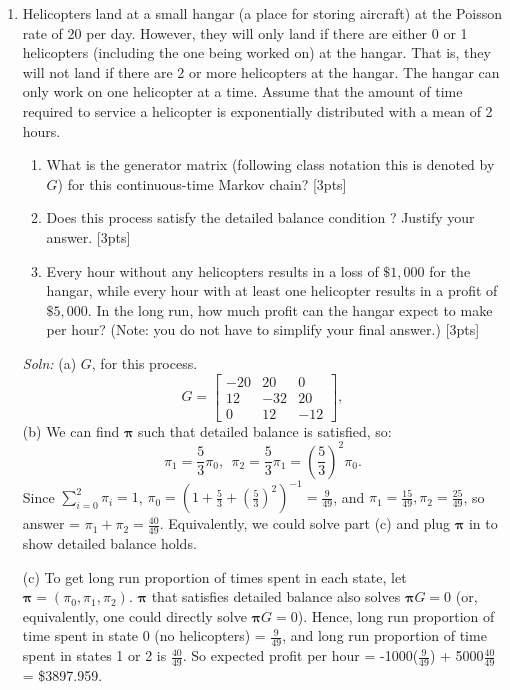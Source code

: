 \documentclass[12pt]{article}
\newcommand{\bpi}{{\mathbf \pi}}
\begin{document}
\begin{enumerate}
\newpage

\item Helicopters land at a small hangar (a place for storing
  aircraft) at the Poisson rate of 20 per day.  However, they will
  only land if there are either 0 or 1 helicopters (including the one
  being worked on) at the hangar. That is, they will not land if there
  are 2 or more helicopters at the hangar. The hangar can only work on
  one helicopter at a time. Assume that the amount of time required to
  service a helicopter is exponentially distributed with a mean of 2
  hours.
\begin{enumerate}
\item What is the generator matrix (following class notation this is denoted by $G$) for this continuous-time Markov chain? [3pts]
\item Does this process satisfy the detailed balance condition ? Justify your answer. [3pts]
\item Every hour without any helicopters results in a loss of
  $\$1,000$ for the hangar, while every hour with at least one
  helicopter results in a profit of $\$5,000$. In the long run, how
  much profit can the hangar expect to make per hour? (Note: you do not have to simplify your final answer.) [3pts]
\end{enumerate}
{\it Soln:} (a) $G$, for this process.
\begin{equation*} G=
  \begin{bmatrix}
    -20 & 20 & 0\\
    12 & -32 & 20\\
    0 & 12 & -12 
  \end{bmatrix},
\end{equation*}
(b) We can find $\bpi$ such that detailed balance is satisfied, so:
$$\pi_1= \frac{5}{3} \pi_0,\:\: \pi_2 = \frac{5}{3} \pi_1 =
\left(\frac{5}{3}\right)^2 \pi_0.$$
Since $\sum_{i=0}^2 \pi_i = 1$,
$\pi_0 = (1 + \frac{5}{3} + \left(\frac{5}{3}\right)^2)^{-1}
=\frac{9}{49}$, and $\pi_1=\frac{15}{49}, \pi_2 =\frac{25}{49}$, so
answer = $\pi_1+\pi_2 = \frac{40}{49}$.  Equivalently, we could solve part (c) and plug $\bpi$ in to show detailed balance holds. 

(c) To get long run proportion of times spent in each state, let
$\bpi=(\pi_0,\pi_1,\pi_2)$. $\bpi$ that satisfies detailed balance
also solves $\bpi G = 0$ (or, equivalently, one could directly solve
$\bpi G = 0$). Hence, long run proportion of time spent in state 0 (no
helicopters) = $\frac{9}{49}$, and long run proportion of time spent
in states 1 or 2 is $\frac{40}{49}$. So expected profit per hour =
-1000($\frac{9}{49}$) + 5000$\frac{40}{49}$ = \$3897.959.


\end{enumerate}
\end{document}
